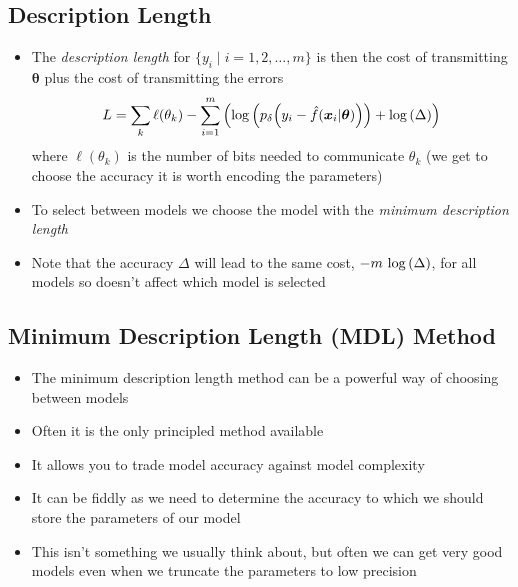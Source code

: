 \begin{slide}
\section{Description Length}

\begin{PauseHighLight}
  \begin{itemize}
  \item The \emph{description length} for $\{y_i \mid i=1,2,\ldots,m\}$ is
    then the cost of transmitting $\bm{\theta}$ plus the cost of
    transmitting the errors
    \begin{align*}
      L = \sum_{k} \ell(\theta_k) - \sum_{i=1}^m \left( \log\left( \strut p_\delta\!\left(y_i -
      \hat{f}(\bm{x}_i|\bm{\theta})\right) \right) + \log\left( \Delta \right) \right)
    \end{align*}
    where $\ell(\theta_k) $ is the number of bits needed to communicate
    $\theta_k$ (we get to choose the accuracy it is worth encoding the
    parameters)\pause
  \item To select between models we choose the model with the
    \emph{minimum description length}\pause
  \item Note that the accuracy $\Delta$ will lead to the same cost,
    $-m\,\log\left( \Delta \right)$, for all models so doesn't affect which model is selected\pause
  \end{itemize}
\end{PauseHighLight}

\end{slide}


\begin{slide}
\section[-1]{Minimum Description Length (MDL) Method}

\begin{PauseHighLight}
  \begin{itemize}
  \item The minimum description length method can be a powerful way of
    choosing between models\pause
  \item Often it is the only principled method available\pause
  \item It allows you to trade model accuracy against model
    complexity\pause
  \item It can be fiddly as we need to determine the accuracy to which
    we should store the parameters of our model\pause
  \item This isn't something we usually think about, but often we can
    get very good models  even when we truncate the parameters to low
    precision\pause
  \end{itemize}
\end{PauseHighLight}

\end{slide}



